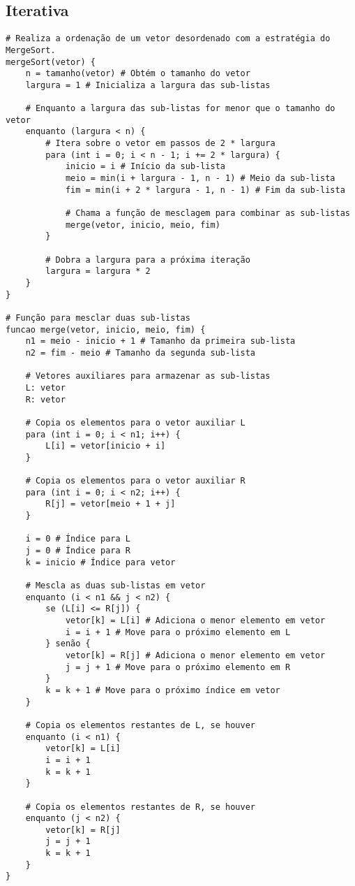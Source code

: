 \subsection{Iterativa}
\begin{verbatim}
# Realiza a ordenação de um vetor desordenado com a estratégia do MergeSort.
mergeSort(vetor) {
    n = tamanho(vetor) # Obtém o tamanho do vetor
    largura = 1 # Inicializa a largura das sub-listas

    # Enquanto a largura das sub-listas for menor que o tamanho do vetor
    enquanto (largura < n) {
        # Itera sobre o vetor em passos de 2 * largura
        para (int i = 0; i < n - 1; i += 2 * largura) {
            inicio = i # Início da sub-lista
            meio = min(i + largura - 1, n - 1) # Meio da sub-lista
            fim = min(i + 2 * largura - 1, n - 1) # Fim da sub-lista

            # Chama a função de mesclagem para combinar as sub-listas
            merge(vetor, inicio, meio, fim)
        }

        # Dobra a largura para a próxima iteração
        largura = largura * 2
    }
}

# Função para mesclar duas sub-listas
funcao merge(vetor, inicio, meio, fim) {
    n1 = meio - inicio + 1 # Tamanho da primeira sub-lista
    n2 = fim - meio # Tamanho da segunda sub-lista

    # Vetores auxiliares para armazenar as sub-listas
    L: vetor
    R: vetor

    # Copia os elementos para o vetor auxiliar L
    para (int i = 0; i < n1; i++) {
        L[i] = vetor[inicio + i]
    }

    # Copia os elementos para o vetor auxiliar R
    para (int i = 0; i < n2; i++) {
        R[j] = vetor[meio + 1 + j]
    }

    i = 0 # Índice para L
    j = 0 # Índice para R
    k = inicio # Índice para vetor

    # Mescla as duas sub-listas em vetor
    enquanto (i < n1 && j < n2) {
        se (L[i] <= R[j]) {
            vetor[k] = L[i] # Adiciona o menor elemento em vetor
            i = i + 1 # Move para o próximo elemento em L
        } senão {
            vetor[k] = R[j] # Adiciona o menor elemento em vetor
            j = j + 1 # Move para o próximo elemento em R
        }
        k = k + 1 # Move para o próximo índice em vetor
    }

    # Copia os elementos restantes de L, se houver
    enquanto (i < n1) {
        vetor[k] = L[i]
        i = i + 1
        k = k + 1
    }

    # Copia os elementos restantes de R, se houver
    enquanto (j < n2) {
        vetor[k] = R[j]
        j = j + 1
        k = k + 1
    }
}

\end{verbatim}
